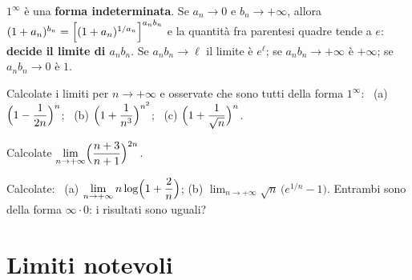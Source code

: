 \begin{vuoto}[Promemoria]{}
$1^\infty$ è una \textbf{forma indeterminata}. Se $a_n\to0$ e $b_n\to+\infty$, allora $(1+a_n)^{b_n}=\Bigl[(1+a_n)^{1/a_n}\Bigr]^{a_nb_n}$ e la quantità fra parentesi quadre tende a $e$: \textbf{decide il limite di $a_nb_n$}. Se $a_nb_n\to\ell$ il limite è $e^\ell$; se $a_nb_n\to+\infty$ è $+\infty$; se $a_nb_n\to0$ è $1$.
\end{vuoto}

\begin{esercizio}[\liv{1}]
Calcolate i limiti per $n\to+\infty$ e osservate che sono tutti della forma $1^\infty$: \ (a) $\Bigl(1-\dfrac1{2n}\Bigr)^n$; \ (b) $\Bigl(1+\dfrac1{n^3}\Bigr)^{n^2}$; \ (c) $\Bigl(1+\dfrac1{\sqrt n}\Bigr)^n$.
\end{esercizio}

\begin{esercizio}[\liv{2}]
Calcolate $\displaystyle\lim_{n\to+\infty}\Bigl(\frac{n+3}{n+1}\Bigr)^{2n}$.
\end{esercizio}

\begin{esercizio}[\liv{2}]
Calcolate: \ (a) $\displaystyle\lim_{n\to+\infty}n\log\Bigl(1+\frac2n\Bigr)$; \qquad (b) $\displaystyle\lim_{n\to+\infty}\sqrt n\,\bigl(e^{1/n}-1\bigr)$. Entrambi sono della forma $\infty\cdot0$: i risultati sono uguali?
\end{esercizio}

\section{Limiti notevoli}

